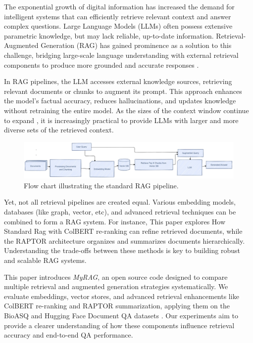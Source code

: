 \documentclass[pdflatex,sn-mathphys-num]{sn-jnl}%
\theoremstyle{thmstyleone}%
\theoremstyle{thmstyletwo}%
\theoremstyle{thmstylethree}%
\begin{document}
The exponential growth of digital information has increased the demand for intelligent systems that can efficiently retrieve relevant context and answer complex questions. Large Language Models (LLMs) often possess extensive parametric knowledge, but may lack reliable, up-to-date information. Retrieval-Augmented Generation (RAG) has gained prominence as a solution to this challenge, bridging large-scale language understanding with external retrieval components to produce more grounded and accurate responses \cite{lewis2020retrieval, guu2020realm}.

In RAG pipelines, the LLM accesses external knowledge sources, retrieving relevant documents or chunks to augment its prompt. This approach enhances the model’s factual accuracy, reduces hallucinations, and updates knowledge without retraining the entire model. As the sizes of the context window continue to expand \cite{liu2023lost}, it is increasingly practical to provide LLMs with larger and more diverse sets of the retrieved context.

\begin{figure}[h]
    \centering
    \includegraphics[width=\linewidth]{StandardRag.pdf} 
    \caption{Flow chart illustrating the standard RAG pipeline.}
    \label{fig:standard_rag_flow}
\end{figure}


Yet, not all retrieval pipelines are created equal. Various embedding models, databases (like graph, vector, etc), and advanced retrieval techniques can be combined to form a RAG system. For instance, This paper explores How Standard Rag with ColBERT \cite{khattab2020colbert} re-ranking can refine retrieved documents, while the RAPTOR architecture \cite{wu2021recursively, raptor2024} organizes and summarizes documents hierarchically. Understanding the trade-offs between these methods is key to building robust and scalable RAG systems.

This paper introduces \textit{MyRAG}, an open source code designed to compare multiple retrieval and augmented generation strategies systematically. We evaluate embeddings, vector stores, and advanced retrieval enhancements like ColBERT re-ranking and RAPTOR summarization, applying them on the BioASQ \cite{bioasq2023} and Hugging Face Document QA datasets \cite{huggingface2024docqa}. Our experiments aim to provide a clearer understanding of how these components influence retrieval accuracy and end-to-end QA performance.
 
\end{document}
